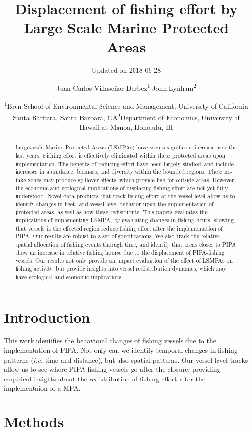 \documentclass[12pt,]{article}
\title{Displacement of fishing effort by Large Scale Marine Protected Areas}
\subtitle{Updated on 2018-09-28}
\author{Juan Carlos Villaseñor-Derbez\textsuperscript{1} John
Lynham\textsuperscript{2}}
\date{\textsuperscript{1}Bren School of Environmental Science and Management,
University of California Santa Barbara, Santa Barbara,
CA\newline\textsuperscript{2}Department of Economics, University of
Hawaii at Manoa, Honolulu, HI}
\begin{document}
\maketitle
\begin{abstract}
Large-scale Marine Protected Areas (LSMPAs) have seen a significant
increase over the last years. Fishing effort is effectively eliminated
within these protected areas upon implementation. The benefits of
reducing effort have been largely studied, and include increases in
abundance, biomass, and diversity within the bounded regions. These
no-take zones may produce spillover effects, which provide fish for
outside areas. However, the economic and ecological implications of
displacing fishing effort are not yet fully understood. Novel data
products that track fishing effort at the vessel-level allow us to
identify changes in fleet- and vessel-level behavior upon the
implementation of protected areas, as well as how these redistribute.
This papers evaluates the implications of implementing LSMPA, by
evaluating changes in fishing hours, showing that vessels in the
effected region reduce fishing effort after the implementation of PIPA.
Our results are robust to a set of specifications. We also track the
relative spatial allocation of fishing events thorugh time, and identify
that areas closer to PIPA show an increase in relative fishing hourse
due to the displacement of PIPA-fishing vessels. Our results not only
provide an impact evaluation of the effect of LSMPAs on fishing
activity, but provide insights into vessel redistribution dynamics,
which may have ecological and economic implications.
\end{abstract}

\clearpage

\section{Introduction}\label{introduction}

This work identifies the behavioral changes of fishing vessels due to
the implementation of PIPA. Not only can we identify temporal changes in
fishing patterns (\emph{i.e.} time and distance), but also spatial
patterns. Our vessel-level tracks allow us to see where PIPA-fishing
vessels go after the closure, providing empirical insights about the
redistribution of fishing effort after the implementaion of a MPA.

\section{Methods}\label{methods}
\end{document}
